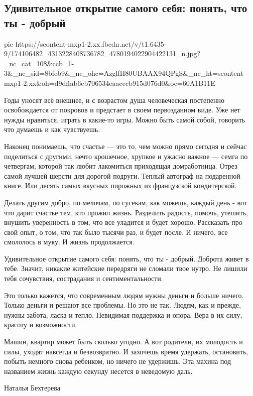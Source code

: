  
 
 
 
 
\subsection{Удивительное открытие самого себя: понять, что ты - добрый}

\ifcmt
  pic https://scontent-mxp1-2.xx.fbcdn.net/v/t1.6435-9/174106482_4313228408736782_4780194022904422131_n.jpg?_nc_cat=108&ccb=1-3&_nc_sid=8bfeb9&_nc_ohc=AzglfH80UBAAX94QPgS&_nc_ht=scontent-mxp1-2.xx&oh=d9dffab6eb706534eaacecb915d076d0&oe=60A1B11E
\fi

Годы уносят всё внешнее, и с возрастом душа человеческая постепенно
освобождается от покровов и предстает в своем первозданном виде. Уже нет нужды
нравиться, играть в какие-то игры. Можно быть самой собой, говорить что думаешь
и как чувствуешь.

Наконец понимаешь, что счастье — это то, чем можно прямо сегодня и сейчас
поделиться с другими, нечто крошечное, хрупкое и ужасно важное — семга по
четвергам, которой так любит лакомиться приходящая домработница. Отрез самой
лучшей шерсти для дорогой подруги. Теплый автограф на подаренной книге. Или
десять самых вкусных пирожных из французской кондитерской.

Делать другим добро, по мелочам, по сусекам, как можешь, каждый день - вот что
дарит счастье тем, кто прожил жизнь. Разделить радость, помочь, утешить,
внушить уверенность в том, что все уладится и будет хорошо. Рассказать про свой
опыт, о том, что так было тысячи раз, и будет после. И ничего, все смололось в
муку. И жизнь продолжается.

Удивительное открытие самого себя: понять, что ты - добрый. Доброта живет в
тебе. Значит, никакие житейские передряги не сломали твое нутро. Не лишили тебя
сочувствия, сострадания и сентиментальности.

Это только кажется, что современным людям нужны деньги и больше ничего. Только
деньги и решают все проблемы. Но это не так. Людям, как и прежде, нужны забота,
ласка и тепло. Невидимая поддержка и опора. Вера в их силу, красоту и
возможности.

Машин, квартир может быть сколько угодно. А вот родители, их молодость и силы,
уходят навсегда и безвозвратно. И захочешь время удержать, остановить, побыть
немного снова ребенком, но ничего не удержишь. Эта махина под названием жизнь
каждую секунду несется в неведомую даль.

Наталья Бехтерева
